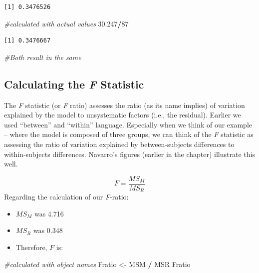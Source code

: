 \documentclass[
  11pt,
]{book}
\newenvironment{Shaded}{\begin{snugshade}}{\end{snugshade}}
\newcommand{\CommentTok}[1]{\textcolor[rgb]{0.37,0.37,0.37}{\textit{#1}}}
\newcommand{\DecValTok}[1]{\textcolor[rgb]{0.06,0.06,0.06}{#1}}
\newcommand{\FloatTok}[1]{\textcolor[rgb]{0.06,0.06,0.06}{#1}}
\newcommand{\NormalTok}[1]{#1}
\newcommand{\OtherTok}[1]{\textcolor[rgb]{0.37,0.37,0.37}{#1}}
\newcommand{\SpecialCharTok}[1]{\textcolor[rgb]{0.43,0.43,0.43}{\textbf{#1}}}
\providecommand{\tightlist}{%
  \setlength{\itemsep}{0pt}\setlength{\parskip}{0pt}}
\begin{document}
\begin{verbatim}
[1] 0.3476526
\end{verbatim}

\begin{Shaded}
\begin{Highlighting}[]
\CommentTok{\#calculated with actual values}
\FloatTok{30.247}\SpecialCharTok{/}\DecValTok{87}
\end{Highlighting}
\end{Shaded}

\begin{verbatim}
[1] 0.3476667
\end{verbatim}

\begin{Shaded}
\begin{Highlighting}[]
\CommentTok{\#Both result in the same}
\end{Highlighting}
\end{Shaded}

\hypertarget{calculating-the-f-statistic}{%
\subsection{\texorpdfstring{Calculating the \emph{F} Statistic}{Calculating the F Statistic}}\label{calculating-the-f-statistic}}

The \emph{F} statistic (or \emph{F} ratio) assesses the ratio (as its name implies) of variation explained by the model to unsystematic factors (i.e., the residual). Earlier we used ``between'' and ``within'' language. Especially when we think of our example -- where the model is composed of three groups, we can think of the \emph{F} statistic as assessing the ratio of variation explained by between-subjects differences to within-subjects differences. Navarro's \citeyearpar{navarro_chapter_2020} figures (earlier in the chapter) illustrate this well.

\[F = \frac{MS_{M}}{MS_{R}}\] Regarding the calculation of our \emph{F}-ratio:

\begin{itemize}
\tightlist
\item
  \(MS_M\) was 4.716
\item
  \(MS_R\) was 0.348
\item
  Therefore, \(F\) is:
\end{itemize}

\begin{Shaded}
\begin{Highlighting}[]
\CommentTok{\#calculated with object names }
\NormalTok{Fratio }\OtherTok{\textless{}{-}}\NormalTok{ MSM }\SpecialCharTok{/}\NormalTok{ MSR}
\NormalTok{Fratio}
\end{Highlighting}
\end{Shaded}
\end{document}
